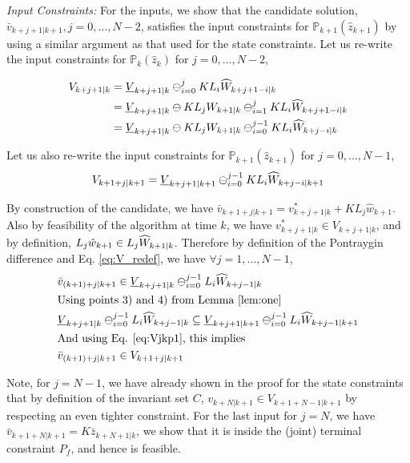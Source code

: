 \textit{Input Constraints:} For the inputs, we show that the candidate solution, $\bar{v}_{k+j+1|k+1}, j=0,\ldots,N-2$, satisfies the input constraints for $\mathbb{P}_{k+1}(\hat{z}_{k+1}) $ by using a similar argument as that used for the state constraints. 
Let us re-write the input constraints for $\mathbb{P}_{k}(\hat{z}_{k})$ for $j=0,\dotsc,N-2$,

\begin{subequations}
\label{eq:V_redef}
\begin{align}
V_{k+j+1|k}&=\underline{V}_{k+j+1|k} \ominus_{i=0}^{j} KL_i\widehat{W}_{k+j+1-i|k} \\
&=\underline{V}_{k+j+1|k} \ominus KL_jW_{k+1|k} \ominus_{i=1}^{j} KL_i\widehat{W}_{k+j+1-i|k} \\
&=\underline{V}_{k+j+1|k} \ominus KL_jW_{k+1|k} \ominus_{i=0}^{j-1} KL_i\widehat{W}_{k+j-i|k}
\end{align}
\end{subequations}

Let us also re-write the input constraints for $\mathbb{P}_{k+1}(\hat{z}_{k+1})$ for $j=0,\dotsc,N-1$,
\begin{equation}
\label{eq:Vjkp1}
V_{k+1+j|k+1}=\underline{V}_{k+j+1|k+1} \ominus_{i=0}^{j-1} KL_i\widehat{W}_{k+j-i|k+1}
\end{equation}

By construction of the candidate, we have $\bar{v}_{k+1+j|k+1}=v^{*}_{k+j+1|k}+KL_j\hat{w}_{k+1}$. Also by feasibility of the algorithm at time $k$, we have $v^{*}_{k+j+1|k} \in V_{k+j+1|k}$, and by definition, $L_j\hat{w}_{k+1} \in L_j\widehat{W}_{k+1|k}$. Therefore by definition of the Pontraygin difference and Eq. \ref{eq:V_redef}, we have $\forall j=1,\dotsc,N-1$,
\begin{subequations}
\begin{align}
&\bar{v}_{(k+1)+j|k+1} \in \underline{V}_{k+j+1|k} \ominus_{i=0}^{j-1}L_i\widehat{W}_{k+j-1|k} \\
&\text{Using points 3) and 4) from Lemma \ref{lem:one}} \nonumber \\
&\underline{V}_{k+j+1|k} \ominus_{i=0}^{j-1}L_i\widehat{W}_{k+j-1|k} \subseteq \underline{V}_{k+j+1|k+1} \ominus_{i=0}^{j-1}L_i\widehat{W}_{k+j-1|k+1} \\
&\text{And using Eq. \ref{eq:Vjkp1}, this implies} \nonumber \\
&\bar{v}_{(k+1)+j|k+1} \in V_{k+1+j|k+1}
\end{align}
\end{subequations}

Note,  for $j=N-1$, we have already shown in the proof for the state constraints that by definition of the invariant set $C$, $v_{k+N|k+1} \in {V}_{k+1+N-1|k+1}$ by respecting an even tighter constraint.
For the last input for $j=N$, we have $\bar{v}_{k+1+N|k+1}=K\bar{z}_{k+N+1|k}$, we show that it is inside the (joint) terminal constraint $P_f$, and hence is feasible.

